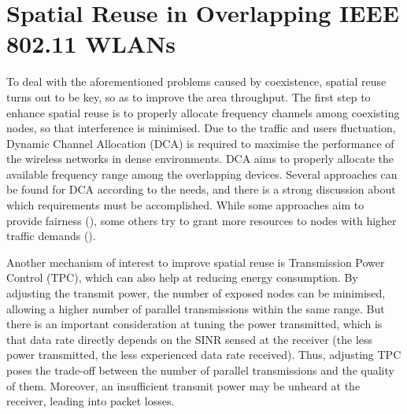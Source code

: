 \documentclass[12pt, a4paper,twoside]{tesi_upf}
\begin{document}
		\section{Spatial Reuse in Overlapping IEEE 802.11 WLANs}
		\label{section:spatial_reuse}		
			To deal with the aforementioned problems caused by coexistence, spatial reuse turns out to be key, so as to improve the area throughput. The first step to enhance spatial reuse is to properly allocate frequency channels among coexisting nodes, so that interference is minimised. Due to the traffic and users fluctuation, Dynamic Channel Allocation (DCA) is required to maximise the performance of the wireless networks in dense environments. DCA aims to properly allocate the available frequency range among the overlapping devices. Several approaches can be found for DCA according to the needs, and there is a strong discussion about which requirements must be accomplished. While some approaches aim to provide fairness (\cite{ling2006joint}), some others try to grant more resources to nodes with higher traffic demands (\cite{wertz2004automatic}). 
			
			Another mechanism of interest to improve spatial reuse is Transmission Power Control (TPC), which can also help at reducing energy consumption. By adjusting the transmit power, the number of exposed nodes can be minimised, allowing a higher number of parallel transmissions within the same range. But there is an important consideration at tuning the power transmitted, which is that data rate directly depends on the SINR sensed at the receiver (the less power transmitted, the less experienced data rate received). Thus, adjusting TPC poses the trade-off between the number of parallel transmissions and the quality of them. Moreover, an insufficient transmit power may be unheard at the receiver, leading into packet losses. 
			
\end{document}
